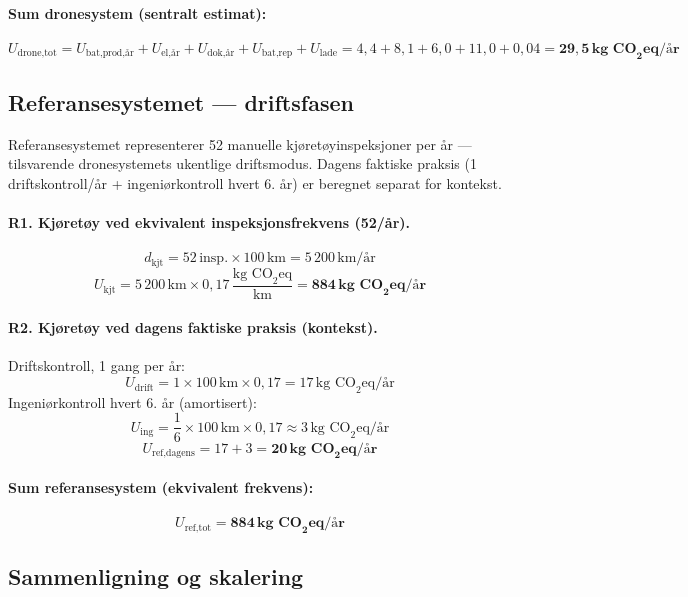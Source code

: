 \paragraph{Sum dronesystem (sentralt estimat):}
\[
    U_{\text{drone,tot}} = U_{\text{bat,prod,år}} + U_{\text{el,år}} + U_{\text{dok,år}} + U_{\text{bat,rep}} + U_{\text{lade}}
    = 4{,}4 + 8{,}1 + 6{,}0 + 11{,}0 + 0{,}04 = \mathbf{29{,}5\,\text{kg CO}_2\text{eq/år}}
\]

\subsection{Referansesystemet — driftsfasen}

Referansesystemet representerer 52 manuelle kjøretøyinspeksjoner per år — tilsvarende dronesystemets ukentlige driftsmodus. Dagens faktiske praksis (1 driftskontroll/år + ingeniørkontroll hvert 6. år) er beregnet separat for kontekst.

\paragraph{R1. Kjøretøy ved ekvivalent inspeksjonsfrekvens (52/år).}
\[
    d_{\text{kjt}} = 52\,\text{insp.} \times 100\,\text{km} = 5\,200\,\text{km/år}
\]
\[
    U_{\text{kjt}} = 5\,200\,\text{km} \times 0{,}17\,\frac{\text{kg CO}_2\text{eq}}{\text{km}} = \mathbf{884\,\text{kg CO}_2\text{eq/år}}
\]

\paragraph{R2. Kjøretøy ved dagens faktiske praksis (kontekst).}
Driftskontroll, 1 gang per år:
\[
    U_{\text{drift}} = 1 \times 100\,\text{km} \times 0{,}17 = 17\,\text{kg CO}_2\text{eq/år}
\]
Ingeniørkontroll hvert 6. år (amortisert):
\[
    U_{\text{ing}} = \frac{1}{6} \times 100\,\text{km} \times 0{,}17 \approx 3\,\text{kg CO}_2\text{eq/år}
\]
\[
    U_{\text{ref,dagens}} = 17 + 3 = \mathbf{20\,\text{kg CO}_2\text{eq/år}}
\]

\paragraph{Sum referansesystem (ekvivalent frekvens):}
\[
    U_{\text{ref,tot}} = \mathbf{884\,\text{kg CO}_2\text{eq/år}}
\]

\subsection{Sammenligning og skalering}

